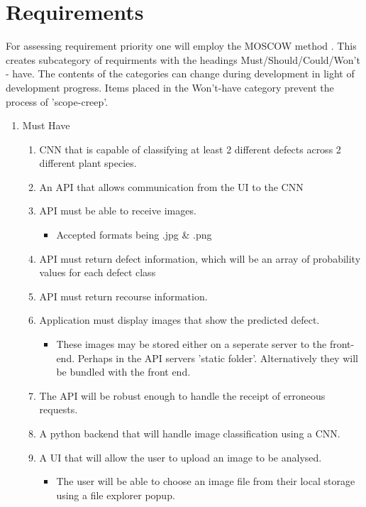 \section{Requirements}
For assessing requirement priority one will employ the MOSCOW method \citep{Clegg199410.5555/561543}. This creates subcategory of requirments with the headings Must/Should/Could/Won't - have. The contents of the categories can change during development in light of development progress. Items placed in the Won't-have category prevent the process of 'scope-creep'.
\begin{enumerate}
  \item Must Have
  \begin{enumerate}
    \item CNN that is capable of classifying at least 2 different defects across 2 different plant species.
    \item An API that allows communication from the UI to the CNN
    \item API must be able to receive images.
      \begin{itemize}
        \item Accepted formats being .jpg \& .png
      \end{itemize}
    \item API must return defect information, which will be an array of probability values for each defect class
    \item API must return recourse information.
    \item Application must display images that show the predicted defect.
      \begin{itemize}
        \item These images may be stored either on a seperate server to the front-end. Perhaps in the API servers 'static folder'. Alternatively they will be bundled with the front end.
      \end{itemize}
  	\item The API will be robust enough to handle the receipt of erroneous requests.
  	\item A python backend that will handle image classification using a CNN.
  	\item A UI that will allow the user to upload an image to be analysed.
    \begin{itemize}
      \item The user will be able to choose an image file from their local storage using a file explorer popup.
    \end{itemize}

\end{enumerate}
\end{enumerate}
